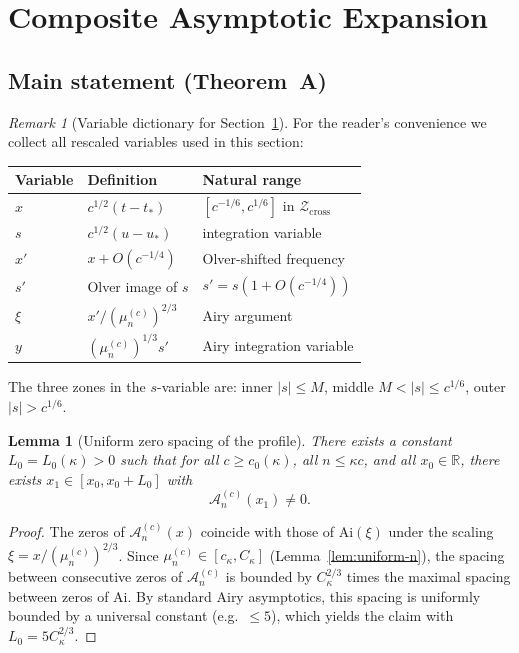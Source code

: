 \documentclass[12pt,a4paper]{amsart}
\newtheorem{lemma}[theorem]{Lemma}
\theoremstyle{definition}
\theoremstyle{remark}
\newtheorem{remark}[theorem]{Remark}
\newcommand{\Ai}{\mathrm{Ai}}
\newcommand{\ustar}{u_*}
\newcommand{\Zcross}{\mathcal{Z}_{\mathrm{cross}}}
\newcommand{\tstar}{t_*}
\begin{document}
\section{Composite Asymptotic Expansion}
\label{sec:composite}

\subsection{Main statement (Theorem~A)}

\begin{remark}[Variable dictionary for Section~\ref{sec:composite}]
\label{rem:variables}
For the reader's convenience we collect
all rescaled variables used in this section:
\begin{center}
\renewcommand{\arraystretch}{1.4}
\begin{tabular}{lll}
\toprule
Variable & Definition & Natural range \\
\midrule
$x$ & $c^{1/2}(t - \tstar)$
    & $[c^{-1/6}, c^{1/6}]$ in $\Zcross$ \\
$s$ & $c^{1/2}(u - \ustar)$
    & integration variable \\
$x'$ & $x + O(c^{-1/4})$
     & Olver-shifted frequency \\
$s'$ & Olver image of $s$
     & $s' = s(1 + O(c^{-1/4}))$ \\
$\xi$ & $x'/(\mu_n^{(c)})^{2/3}$
      & Airy argument \\
$y$  & $(\mu_n^{(c)})^{1/3} s'$
     & Airy integration variable \\
\bottomrule
\end{tabular}
\end{center}
The three zones in the $s$-variable are:
inner $|s| \le M$,
middle $M < |s| \le c^{1/6}$,
outer $|s| > c^{1/6}$.
\end{remark}

\begin{lemma}[Uniform zero spacing of the profile]
\label{lem:zero-spacing}
There exists a constant $L_0 = L_0(\kappa) > 0$ such that
for all $c \ge c_0(\kappa)$, all $n \le \kappa c$,
and all $x_0 \in \mathbb{R}$,
there exists $x_1 \in [x_0, x_0 + L_0]$ with
\[
  \mathcal{A}_n^{(c)}(x_1) \ne 0.
\]
\end{lemma}

\begin{proof}
The zeros of $\mathcal{A}_n^{(c)}(x)$ coincide with those
of $\Ai(\xi)$ under the scaling
$\xi = x/(\mu_n^{(c)})^{2/3}$.
Since $\mu_n^{(c)} \in [c_\kappa, C_\kappa]$
(Lemma~\ref{lem:uniform-n}),
the spacing between consecutive zeros of
$\mathcal{A}_n^{(c)}$ is bounded by
$C_\kappa^{2/3}$ times the maximal spacing between
zeros of $\Ai$.
By standard Airy asymptotics, this spacing is uniformly
bounded by a universal constant (e.g.\ $\le 5$),
which yields the claim with $L_0 = 5C_\kappa^{2/3}$.
\end{proof}
\end{document}
